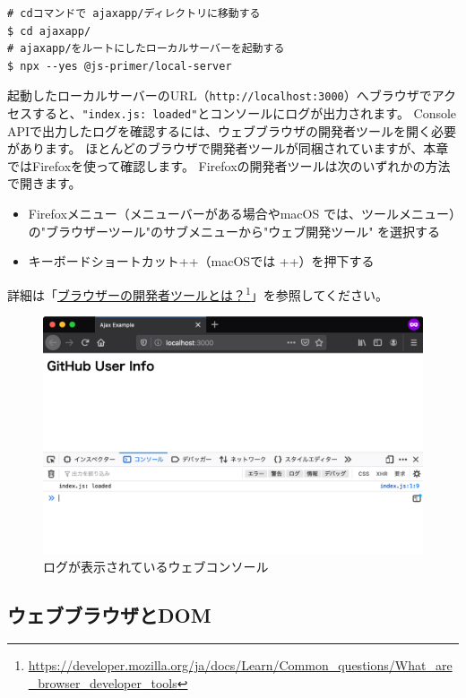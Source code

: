 \begin{lstlisting}
# cdコマンドで ajaxapp/ディレクトリに移動する
$ cd ajaxapp/
# ajaxapp/をルートにしたローカルサーバーを起動する
$ npx --yes @js-primer/local-server
\end{lstlisting}

起動したローカルサーバーのURL（\texttt{http://localhost:3000}）へブラウザでアクセスすると、\texttt{"index.js: loaded"}とコンソールにログが出力されます。
Console
APIで出力したログを確認するには、ウェブブラウザの開発者ツールを開く必要があります。
ほとんどのブラウザで開発者ツールが同梱されていますが、本章ではFirefoxを使って確認します。
Firefoxの開発者ツールは次のいずれかの方法で開きます。

\begin{itemize}
\item
  Firefoxメニュー（メニューバーがある場合やmacOS
  では、ツールメニュー）の"ブラウザーツール"のサブメニューから"ウェブ開発ツール"
  を選択する
\item
  キーボードショートカット++（macOSでは
  ++）を押下する
\end{itemize}

詳細は「\href{https://developer.mozilla.org/ja/docs/Learn/Common_questions/What_are_browser_developer_tools}{ブラウザーの開発者ツールとは？}\footnote{\url{https://developer.mozilla.org/ja/docs/Learn/Common_questions/What_are_browser_developer_tools}}」を参照してください。

\begin{figure}[h]
\centering
\includegraphics[width=120mm]{fig/fig-1.pdf}
\caption{ログが表示されているウェブコンソール}
\end{figure}

\hypertarget{web-browsers-and-dom}{%
\subsection{ウェブブラウザとDOM}\label{web-browsers-and-dom}}

